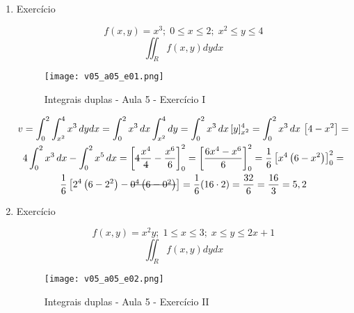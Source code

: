 \begin{enumerate}
	\item Exercício
	
	\begin{equation*}
		f(x,y) = x^3;\; 0 \leq x \leq 2;\; x^2 \leq y \leq 4	
	\end{equation*}
	\begin{equation*}
		\iint_R f(x, y) dy dx
	\end{equation*}
	
	\begin{figure}[htb]
		\caption{Integrais duplas - Aula 5 - Exercício I}
		\label{v05_a05_e01}
		\centering
		\texttt{[image: v05\_a05\_e01.png]}		
	\end{figure}
	
	\begin{gather*}
		v = \int_0^2 \int_{x^2}^4 x^3\, dy dx = \int_0^2 x^3\, dx \int_{x^2}^4 dy = \int_0^2 x^3\, dx\, [y]_{x^2}^4 = \int_0^2 x^3\, dx\, \left[4 - x^2\right] =\\ 4\int_0^2 x^3\, dx - \int_0^2 x^5\, dx = \left[\overstrike{4}\dfrac{x^4}{\overstrike{4}} - \frac{x^6}{6}\right]_0^2 = \left[\dfrac{6x^4 - x^6}{6}\right]_0^2 = \frac{1}{6}\left[x^4\left(6 - x^2\right)\right]_0^2 =\\ \frac{1}{6}\left[2^4\left(6 - 2^2\right) - \overstrike{0^4\left(6 - 0^2\right)}\right] = \dfrac{1}{6}(16\cdot2) = \dfrac{32}{6} = \dfrac{16}{3} = 5,2
	\end{gather*}
	
	\item Exercício
	
	\begin{equation*}
		f(x,y) = x^2y;\; 1 \leq x \leq 3;\; x \leq y \leq 2x + 1
	\end{equation*}
	\begin{equation*}
		\iint_R f(x, y) dy dx
	\end{equation*}
	
	\begin{figure}[htb]
		\caption{Integrais duplas - Aula 5 - Exercício II}
		\label{v05_a05_e02}
		\centering
		\texttt{[image: v05\_a05\_e02.png]}		
	\end{figure}
	

\end{enumerate}
